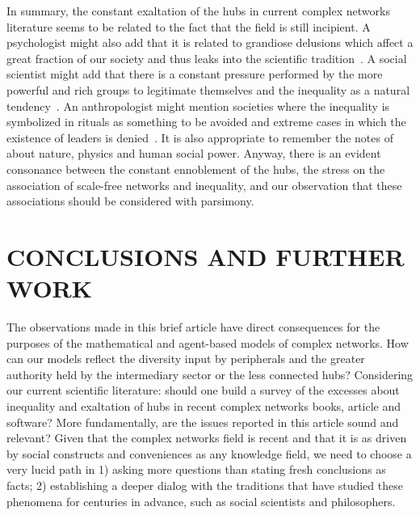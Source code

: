 \documentclass[12pt,fleqn]{article}
\begin{document}
In summary, the constant exaltation of the hubs in current
complex networks literature seems to be related to the
fact that the field is still incipient.
A psychologist might also add that it is related to
grandiose delusions which affect a great fraction of
our society and thus leaks into the scientific tradition~\citep{grandiose}.
A social scientist might add that there is a constant
pressure performed by the more powerful and rich groups
to legitimate themselves and the inequality as a natural tendency~\citep{socialB,marcuse}.
An anthropologist might mention societies where the inequality 
is symbolized in rituals as something to be avoided
and extreme cases in which the existence of leaders is denied~\citep{clastres}.
It is also appropriate to remember the notes of~\cite{heisenberg}
about nature, physics and human social power.
Anyway, there is an evident consonance between the
constant ennoblement of the hubs, the stress on the association
of scale-free networks and inequality,
and our observation that these associations should be
considered with parsimony.

\section{CONCLUSIONS AND FURTHER WORK}\label{sec:con}
The observations made in this brief article have direct consequences for
the purposes of the mathematical and agent-based models of complex networks.
How can our models reflect the diversity input by peripherals
and the greater authority held by the intermediary sector or the less connected hubs?
Considering our current scientific literature:
should one build a survey of the
excesses about inequality and exaltation of hubs in recent complex networks books, article and software?
More fundamentally, are the issues reported in this article sound
and relevant?
Given that the complex networks field is recent and that it is as driven
by social constructs and conveniences as any knowledge field,
we need to choose a very lucid path
in 1) asking more questions than stating fresh conclusions as facts;
2) establishing a deeper dialog with the traditions that have studied
these phenomena for centuries in advance, such as social scientists and philosophers.
\end{document}
